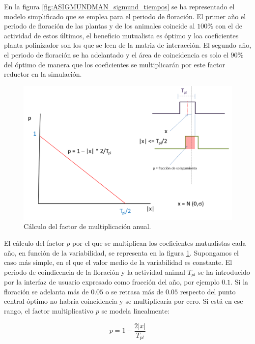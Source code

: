 En la figura \ref{fig:ASIGMUNDMAN_sigmund_tiempos} se ha representado el modelo simplificado que se emplea para el periodo de floración. El primer año el periodo de floración de las
plantas y de los animales coincide al $100\%$ con el de actividad de estos últimos, el beneficio mutualista es óptimo y loa coeficientes planta polinizador son los que se leen de la
matriz de interacción. El segundo año, el periodo de floración se ha adelantado y el área de coincidencia es solo el $90\%$ del óptimo de manera que los coeficientes se multiplicarán por este factor reductor en la simulación.

\begin{figure}[h!]
\centering
\includegraphics[scale=1]{ManFigs/sigmund_pendiente.png}
\caption{Cálculo del factor de multiplicación anual.}
\label{fig:ASIGMUNDMAN_sigmund_pendiente}
\end{figure}

El cálculo del factor $p$ por el que se multiplican los coeficientes mutualistas cada año, en función de la variabilidad, se representa en la figura \ref{fig:ASIGMUNDMAN_sigmund_pendiente}. Supongamos el caso más simple, en el que el valor medio de la variabilidad es constante. El periodo de coindicencia de la floración y la actividad animal $T_{pl}$ se ha introducido por la interfaz de usuario expresado como fracción del año, por ejemplo $0.1$. Si la floración se adelanta más de $0.05$ o se retrasa más de $0.05$ respecto del punto central óptimo no habría coincidencia y se multiplicaría por cero. Si está en ese rango, el factor multiplicativo $p$ se modela linealmente:

\begin{equation}
p = 1 - \frac{2|x|}{T_{pl}}
\label{eq:sigmund_p}
\end{equation}

